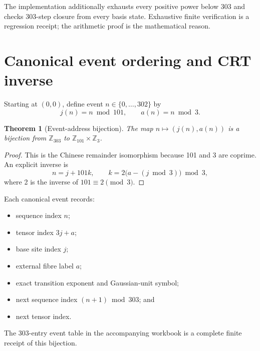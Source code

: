 \documentclass[11pt,a4paper]{article}
\newtheorem{theorem}{Theorem}
\theoremstyle{definition}
\newcommand{\Zthree}{\mathbb Z_{3}}
\newcommand{\Zone}{\mathbb Z_{101}}
\begin{document}
The implementation additionally exhausts every positive power below 303 and checks 303-step closure from every basis state. Exhaustive finite verification is a regression receipt; the arithmetic proof is the mathematical reason.

\section{Canonical event ordering and CRT inverse}
Starting at $(0,0)$, define event $n\in\{0,\ldots,302\}$ by
\begin{equation}
j(n)=n\bmod101,
\qquad
a(n)=n\bmod3.
\end{equation}

\begin{theorem}[Event-address bijection]
The map $n\mapsto(j(n),a(n))$ is a bijection from $\mathbb Z_{303}$ to $\Zone\times\Zthree$.
\end{theorem}
\begin{proof}
This is the Chinese remainder isomorphism because 101 and 3 are coprime. An explicit inverse is
\begin{equation}
n=j+101k,
\qquad
k=2\bigl(a-(j\bmod3)\bigr)\bmod3,
\end{equation}
where 2 is the inverse of $101\equiv2\pmod3$.
\end{proof}

Each canonical event records:
\begin{itemize}
\item sequence index $n$;
\item tensor index $3j+a$;
\item base site index $j$;
\item external fibre label $a$;
\item exact transition exponent and Gaussian-unit symbol;
\item next sequence index $(n+1)\bmod303$; and
\item next tensor index.
\end{itemize}
The 303-entry event table in the accompanying workbook is a complete finite receipt of this bijection.
\end{document}
